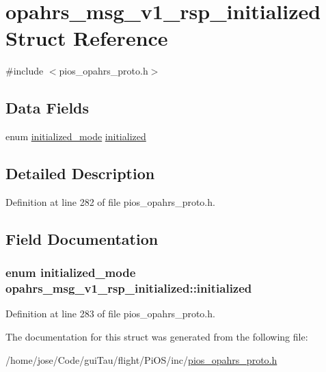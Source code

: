 \hypertarget{structopahrs__msg__v1__rsp__initialized}{\section{opahrs\-\_\-msg\-\_\-v1\-\_\-rsp\-\_\-initialized Struct Reference}
\label{structopahrs__msg__v1__rsp__initialized}
}


{\ttfamily \#include $<$pios\-\_\-opahrs\-\_\-proto.\-h$>$}

\subsection*{Data Fields}
\begin{DoxyCompactItemize}
\item 
enum \hyperlink{group___p_i_o_s___o_p_a_h_r_s_ga46293a5eaecb18912e7ef0f490b742c0}{initialized\-\_\-mode} \hyperlink{structopahrs__msg__v1__rsp__initialized_ab4d1132a02339145521fb0fcbf253f8a}{initialized}
\end{DoxyCompactItemize}


\subsection{Detailed Description}


Definition at line 282 of file pios\-\_\-opahrs\-\_\-proto.\-h.



\subsection{Field Documentation}
\hypertarget{structopahrs__msg__v1__rsp__initialized_ab4d1132a02339145521fb0fcbf253f8a}{
\subsubsection[{initialized}]{\setlength{\rightskip}{0pt plus 5cm}enum {\bf initialized\-\_\-mode} opahrs\-\_\-msg\-\_\-v1\-\_\-rsp\-\_\-initialized\-::initialized}}\label{structopahrs__msg__v1__rsp__initialized_ab4d1132a02339145521fb0fcbf253f8a}


Definition at line 283 of file pios\-\_\-opahrs\-\_\-proto.\-h.



The documentation for this struct was generated from the following file\-:\begin{DoxyCompactItemize}
\item 
/home/jose/\-Code/gui\-Tau/flight/\-Pi\-O\-S/inc/\hyperlink{pios__opahrs__proto_8h}{pios\-\_\-opahrs\-\_\-proto.\-h}\end{DoxyCompactItemize}
